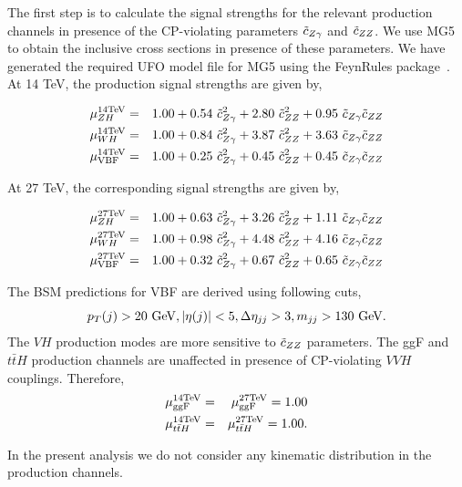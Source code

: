 {
The first step is to calculate the signal strengths for the relevant production channels in presence of the CP-violating
parameters $\tilde c_{Z\gamma}$ and $\tilde c_{ZZ}$. We use MG5~\cite{} to obtain the inclusive cross sections in presence of these parameters. We have generated the required UFO model file for MG5 using the FeynRules package~\cite{}.  At 14 TeV, the production signal strengths are given by, }


\begin{eqnarray}\label{eq:mu14tev}
 \mu_{ZH}^{\rm 14 TeV} &=& 1.00 +  0.54~ \tilde c_{Z\gamma}^2 + 2.80~ \tilde c_{ZZ}^2 + 0.95~ \tilde c_{Z\gamma} \tilde c_{ZZ} \\
 \mu_{WH}^{\rm 14 TeV} &=& 1.00  + 0.84~ \tilde c_{Z\gamma}^2 + 3.87~ \tilde c_{ZZ}^2 
   + 3.63~\tilde c_{Z\gamma}\tilde c_{ZZ} \\
 \mu_{\rm VBF}^{\rm 14 TeV} &=& 1.00  + 0.25~ \tilde c_{Z\gamma}^2 + 0.45~ \tilde c_{ZZ}^2  
   + 0.45~\tilde c_{Z\gamma}\tilde c_{ZZ}
\end{eqnarray}




{ At 27 TeV, the corresponding signal strengths are given by,}

\begin{eqnarray}\label{eq:mu27tev}
 \mu_{ZH}^{\rm 27 TeV} &=& 1.00 +  0.63~ \tilde c_{Z\gamma}^2 + 3.26~ \tilde c_{ZZ}^2 + 1.11~ \tilde c_{Z\gamma} \tilde c_{ZZ} \\
 \mu_{WH}^{\rm 27 TeV} &=& 1.00 + 0.98~ \tilde c_{Z\gamma}^2 + 4.48~ \tilde c_{ZZ}^2 
  + 4.16~\tilde c_{Z\gamma}\tilde c_{ZZ} \\
 \mu_{\rm VBF}^{\rm 27 TeV} &=& 1.00  + 0.32~ \tilde c_{Z\gamma}^2 + 0.67~ \tilde c_{ZZ}^2  
  + 0.65~\tilde c_{Z\gamma}\tilde c_{ZZ}
\end{eqnarray}

The BSM predictions for VBF are derived using following cuts, 
\begin{equation}
 p_T(j) > 20~{\rm GeV}, |\eta(j)| < 5, \Delta\eta_{jj} > 3, m_{jj} > 130~{\rm GeV} \nonumber.
\end{equation}
The $VH$ production modes are more sensitive to $\tilde c_{ZZ}$ parameters.
The ggF and $t{\bar t}H$ production channels are unaffected in presence of CP-violating $VVH$ 
couplings. Therefore, 
% 
\begin{eqnarray}
 \mu_{\rm ggF}^{\rm 14 TeV} &=& \mu_{\rm ggF}^{\rm 27 TeV} =  1.00 \\
 \mu_{t \bar t H}^{\rm 14 TeV} &=& \mu_{t\bar t H}^{\rm 27 TeV} =  1.00 .
\end{eqnarray}

{ In the present analysis we do not consider any kinematic distribution in the production channels.} \\

